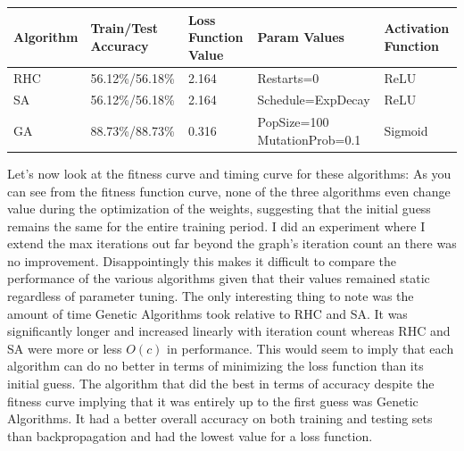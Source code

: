 \documentclass[11pt]{article}
\begin{document}
    \begin{center}
        \begin{tabular}{| l | l | l | l | l |}
            \hline
            Algorithm & Train/Test Accuracy & Loss Function Value & Param Values                 & Activation Function   \\
            \hline
            \hline
            RHC       & 56.12\%/56.18\%     & 2.164               & Restarts=0                   & ReLU \\
            \hline
            SA        & 56.12\%/56.18\%     & 2.164               & Schedule=ExpDecay            & ReLU \\
            \hline
            GA        & 88.73\%/88.73\%     & 0.316               & PopSize=100 MutationProb=0.1 & Sigmoid               \\
            \hline
        \end{tabular}
    \end{center}
    Let's now look at the fitness curve and timing curve for these algorithms:
    As you can see from the fitness function curve, none of the three algorithms even change value during the optimization
    of the weights, suggesting that the initial guess remains the same for the entire training period.
    I did an experiment where I extend the max iterations out far beyond the graph's iteration count an there was no improvement.
    Disappointingly this makes it difficult to compare the performance of the various algorithms given that their values
    remained static regardless of parameter tuning.
    The only interesting thing to note was the amount of time Genetic Algorithms took relative to RHC and SA.
    It was significantly longer and increased linearly with iteration count whereas RHC and SA were more or less $O(c)$ in performance.
    This would seem to imply that each algorithm can do no better in terms of minimizing the loss function than its initial guess.
    The algorithm that did the best in terms of accuracy despite the fitness curve implying that it was entirely up to the first
    guess was Genetic Algorithms.
    It had a better overall accuracy on both training and testing sets than backpropagation and had the lowest value
    for a loss function.
\end{document}

